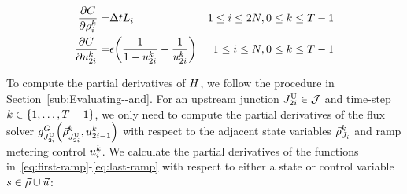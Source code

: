 \begin{eqnarray*}
\pfrac{\cost}{\discrete{\link}{\tind}}= & \Delta tL_{i} & 1\le i\le2\nlinks,0\le k\le T-1\\
\pfrac{\cost}{\ramp_{2\link}^{\tind}}= & \barrierTerm\left(\frac{1}{1-\ramp_{2\link}^{\tind}}-\frac{1}{\ramp_{2\link}^{\tind}}\right) & 1\le i\le\nlinks,0\le k\le T-1
\end{eqnarray*}


To compute the partial derivatives of $H$, we follow the procedure
in Section~\ref{sub:Evaluating--and}. For an upstream junction
$J_{2i}^{\text{U}}\in\mathcal{J}$ and time-step $k\in\intrange 1{\ntime-1}$,
we only need to compute the partial derivatives of the flux solver
$\god_{\jup{2\link}}\left(\juncstate{\jup{2\link}}{\tind},\ramp_{2\link-1}^{\tind}\right)_{\text{}}$
with respect to the adjacent state variables $\vec{\rho}_{J_{i}}^{k}$
and ramp metering control $u_{i}^{k}$. We calculate the
partial derivatives of the functions in~\eqref{eq:first-ramp}-\eqref{eq:last-ramp}
with respect to either a state or control variable$s\in\vec{\rho}\cup\vec{u}$:

